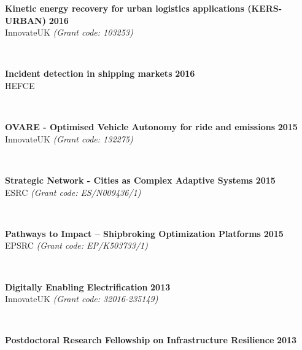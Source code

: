 \documentclass[margin]{res}
\newcommand\tab[1][1cm]{\hspace*{#1}}
\begin{document}
\begin{resume}
\begin{minipage}{\textwidth}
	{\bf Kinetic energy recovery for urban logistics applications (KERS-URBAN)} \hfill {\bf 2016} \\
	\tab[0.2in] 
	\quad InnovateUK
	\textit{(Grant code: 103253)}
	\end{minipage}
	\\
	\vspace{0.03in}
	\begin{minipage}{\textwidth}
	{\bf Incident detection in shipping markets} \hfill {\bf 2016} \\
	\tab[0.2in] 
	\quad HEFCE
	\end{minipage}
	\\
	\vspace{0.03in}
	\begin{minipage}{\textwidth}
	{\bf OVARE - Optimised Vehicle Autonomy for ride and emissions} \hfill {\bf 2015} \\
	\tab[0.2in] 
	\quad InnovateUK
	\textit{(Grant code: 132275)}
	\end{minipage}
	\\
	\vspace{0.03in}
	\begin{minipage}{\textwidth}
	{\bf Strategic Network - Cities as Complex Adaptive Systems} \hfill {\bf 2015} \\
	\tab[0.2in] 
	\quad ESRC
	\textit{(Grant code: ES/N009436/1)}
	\end{minipage}
	\\
	\vspace{0.03in}
	\begin{minipage}{\textwidth}
	{\bf Pathways to Impact – Shipbroking Optimization Platforms} \hfill {\bf 2015} \\
	\tab[0.2in] 
	\quad EPSRC
	\textit{(Grant code: EP/K503733/1)}
	\end{minipage}
	\\
	\vspace{0.03in}
	\begin{minipage}{\textwidth}
	{\bf Digitally Enabling Electrification} \hfill {\bf 2013} \\
	\tab[0.2in] 
	\quad InnovateUK
	\textit{(Grant code: 32016-235149)}
	\end{minipage}
	\\
	\vspace{0.03in}
	\begin{minipage}{\textwidth}
	{\bf Postdoctoral Research Fellowship on Infrastructure Resilience} \hfill {\bf 2013} \\

\end{minipage}
\end{resume}
\end{document}
